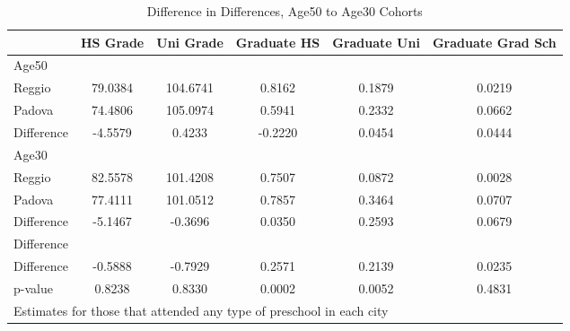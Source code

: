 \begin{table}[htbp]\centering
\caption{Difference in Differences, Age50 to Age30 Cohorts}
\begin{tabular}{l*{5}{c}}
\hline\hline
            &    HS Grade&   Uni Grade& Graduate HS&Graduate Uni&Graduate Grad Sch\\
\hline
Age50       &            &            &            &            &            \\
Reggio      &     79.0384&    104.6741&      0.8162&      0.1879&      0.0219\\
Padova      &     74.4806&    105.0974&      0.5941&      0.2332&      0.0662\\
Difference  &     -4.5579&      0.4233&     -0.2220&      0.0454&      0.0444\\
\hline
Age30       &            &            &            &            &            \\
Reggio      &     82.5578&    101.4208&      0.7507&      0.0872&      0.0028\\
Padova      &     77.4111&    101.0512&      0.7857&      0.3464&      0.0707\\
Difference  &     -5.1467&     -0.3696&      0.0350&      0.2593&      0.0679\\
\hline
Difference  &            &            &            &            &            \\
Difference  &     -0.5888&     -0.7929&      0.2571&      0.2139&      0.0235\\
p-value     &      0.8238&      0.8330&      0.0002&      0.0052&      0.4831\\
\hline\hline
\multicolumn{6}{l}{\footnotesize Estimates for those that attended any type of preschool in each city}\\
\end{tabular}
\end{table}

